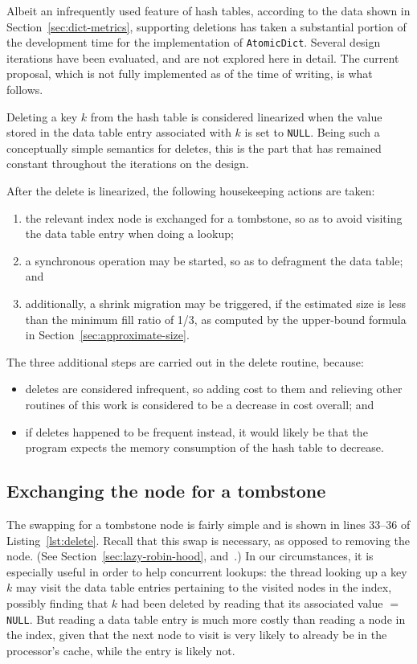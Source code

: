 Albeit an infrequently used feature of hash tables, according to the data shown in Section~\ref{sec:dict-metrics}, supporting deletions has taken a substantial portion of the development time for the implementation of \texttt{AtomicDict}.
Several design iterations have been evaluated, and are not explored here in detail.
The current proposal, which is not fully implemented as of the time of writing, is what follows.

Deleting a key $k$ from the hash table is considered linearized when the value stored in the data table entry associated with $k$ is set to \texttt{NULL}.
Being such a conceptually simple semantics for deletes, this is the part that has remained constant throughout the iterations on the design.

After the delete is linearized, the following housekeeping actions are taken:
\begin{enumerate}
    \item the relevant index node is exchanged for a tombstone, so as to avoid visiting the data table entry when doing a lookup;
    \item a synchronous operation may be started, so as to defragment the data table; and
    \item additionally, a shrink migration may be triggered, if the estimated size is less than the minimum fill ratio of 1/3, as computed by the upper-bound formula in Section~\ref{sec:approximate-size}.
\end{enumerate}

The three additional steps are carried out in the delete routine, because:
\begin{itemize}
    \item deletes are considered infrequent, so adding cost to them and relieving other routines of this work is considered to be a decrease in cost overall; and
    \item if deletes happened to be frequent instead, it would likely be that the program expects the memory consumption of the hash table to decrease.
\end{itemize}

\subsection{Exchanging the node for a tombstone}\label{subsec:exchanging-node-tombstone}

The swapping for a tombstone node is fairly simple and is shown in lines 33--36 of Listing~\ref{lst:delete}.
Recall that this swap is necessary, as opposed to removing the node.
(See Section~\ref{sec:lazy-robin-hood}, and~\cite[\S6.4]{the-art-vol-2}.)
In our circumstances, it is especially useful in order to help concurrent lookups: the thread looking up a key $k$ may visit the data table entries pertaining to the visited nodes in the index, possibly finding that $k$ had been deleted by reading that its associated value $=$ \texttt{NULL}.
But reading a data table entry is much more costly than reading a node in the index, given that the next node to visit is very likely to already be in the processor's cache, while the entry is likely not.

